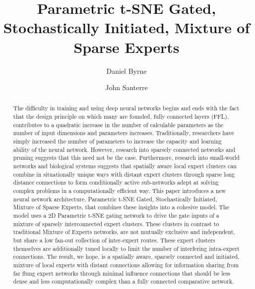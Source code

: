 \documentclass{llncs}
\title{Parametric t-SNE Gated, Stochastically Initiated, Mixture of Sparse Experts}
\author{
 Daniel Byrne\inst{1} \and
 John Santerre\inst{1}
}
\institute{
Master of Science in Data Science, Southern Methodist University,
Dallas TX 75275 USA
\email{\{byrned,santeerej\}@smu.edu}
}
\begin{document}
\maketitle              %

\setcounter{footnote}{0}
\begin{abstract}

The difficulty in training and using deep neural networks begins and ends with the fact that the design principle on which many are founded, fully connected layers (FFL), contributes to a quadratic increase in the number of calculable parameters as the number of input dimensions and parameters increases. Traditionally, researchers have simply increased the number of parameters to increase the capacity and learning ability of the neural network. However, research into sparsely connected networks and pruning suggests that this need not be the case.  Furthermore, research into small-world networks and biological systems suggests that spatially aware local expert clusters can combine in situationally unique ways with distant expert clusters through sparse long distance connections to form conditionally active sub-networks adept at solving complex problems in a computationally efficient way. This paper introduces a new neural network architecture, Parametric t-SNE Gated, Stochastically Initiated, Mixture of Sparse Experts, that combines these insights into a cohesive model.  The model uses a 2D Parametric t-SNE gating network to drive the gate inputs of a mixture of sparsely interconnected expert clusters. These clusters in contrast to traditional Mixture of Experts networks, are not mutually exclusive and independent, but share a low fan-out collection of inter-expert routes.  These expert clusters themselves are additionally tuned locally to limit the number of interfering intra-expert connections. The result, we hope, is a spatially aware, sparsely connected and initiated, mixture of local experts with distant connections allowing for information sharing from far flung expert networks through minimal influence connections that should be less dense and less computationally complex than a fully connected comparative network.

\end{abstract}

\end{document}
